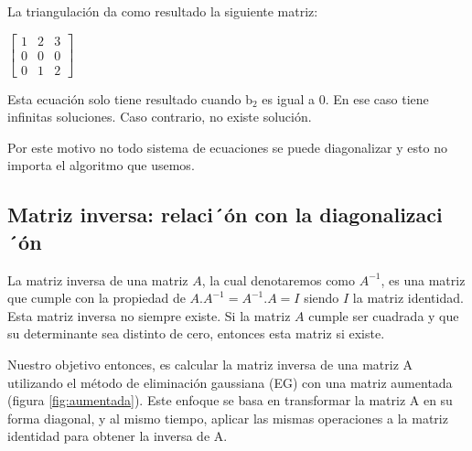 La triangulación da como resultado la siguiente matriz:

\begin{center}
$\begin{bmatrix}
1 & 2 & 3\\
0 & 0 & 0\\
0 & 1 & 2
\end{bmatrix}$
\end{center}

Esta ecuación solo tiene resultado cuando b$_2$ es igual a 0. En ese caso tiene infinitas soluciones. Caso contrario, no existe solución.

Por este motivo no todo sistema de ecuaciones se puede diagonalizar y esto no importa el algoritmo que usemos.

\subsection{Matriz inversa: relaci´ón con la diagonalizaci´ón}
\label{opcionales}
\label{sec:inversa}

La matriz inversa de una matriz $A$, la cual denotaremos como $A^{-1}$, es una matriz que cumple con la propiedad de $A.A^{-1}=A^{-1}.A=I$ siendo $I$ la matriz identidad. Esta matriz inversa no siempre existe. Si la matriz $A$ cumple ser cuadrada y que su determinante \cite{Strang-determinante} sea distinto de cero, entonces esta matriz si existe.

Nuestro objetivo entonces, es calcular la matriz inversa de una matriz A utilizando el método de eliminación gaussiana (EG) con una matriz aumentada (figura \ref{fig:aumentada}). Este enfoque se basa en transformar la matriz A en su forma diagonal, y al mismo tiempo, aplicar las mismas operaciones a la matriz identidad para obtener la inversa de A.

